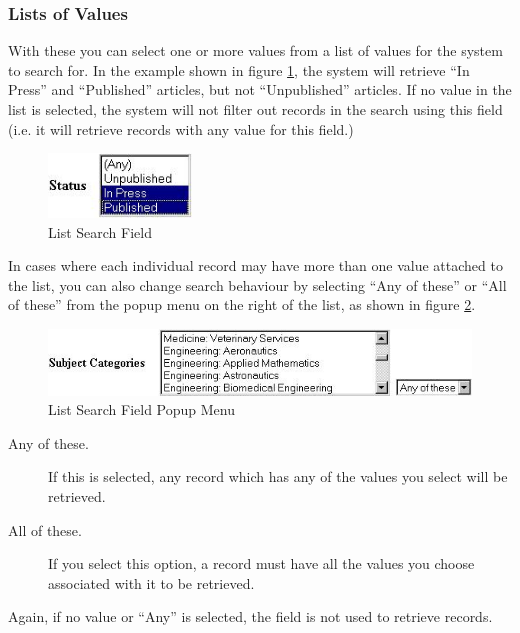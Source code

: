 \subsubsection{Lists of Values}

With these you can select one or more values from a list of values for the system to search for. In the example shown in figure \ref{list_search_field}, the system will retrieve ``In Press'' and ``Published'' articles, but not ``Unpublished'' articles. If no value in the list is selected, the system will not filter out records in the search using this field (i.e. it will retrieve records with any value for this field.)

\begin{figure}
\centerline{\includegraphics[width=1.5in]{images/list-search-field}}
\caption{\label{list_search_field} List Search Field}
\end{figure}

In cases where each individual record may have more than one value attached to the list, you can also change search behaviour by selecting ``Any of these'' or ``All of these'' from the popup menu on the right of the list, as shown in figure \ref{list_search_anyall}.

\begin{figure}
\centerline{\includegraphics[width=4.5in]{images/list-search-anyall}}
\caption{\label{list_search_anyall} List Search Field Popup Menu}
\end{figure}

\begin{description}
\item[Any of these.] If this is selected, any record which has any of the values you select will be retrieved.
\item[All of these.] If you select this option, a record must have all the values you choose associated with it to be retrieved.
\end{description}

Again, if no value or ``Any'' is selected, the field is not used to retrieve records.


